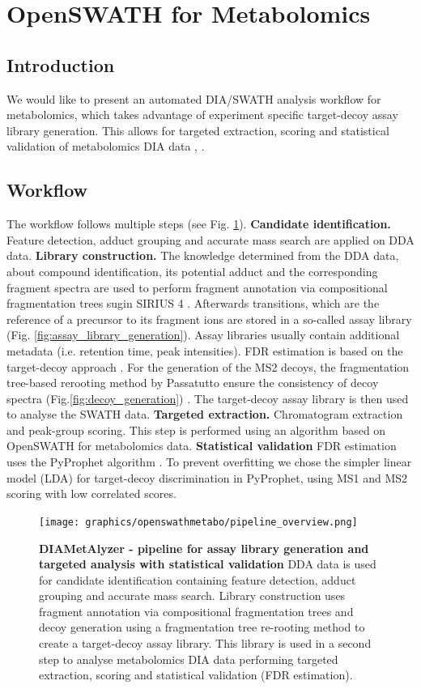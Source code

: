 \section{OpenSWATH for Metabolomics}
\subsection{Introduction}
We would like to present an automated DIA/SWATH analysis workflow for metabolomics, which takes advantage of experiment specific target-decoy assay library generation. This allows for targeted extraction, scoring and statistical validation of metabolomics DIA data \cite{Rost2014}, \cite{Teleman2015}. 

\subsection{Workflow}
The workflow follows multiple steps (see Fig. \ref{fig:pipline_overview}). \textbf{Candidate identification.} Feature detection, adduct grouping and accurate mass search are applied on DDA data. \textbf{Library construction.} The knowledge determined from the DDA data, about  compound identification, its potential adduct and the corresponding fragment spectra are used to perform fragment annotation via compositional fragmentation trees sugin SIRIUS 4 \cite{Duhrkop2019}. Afterwards transitions, which are the reference of a precursor to its fragment ions are stored in a so-called assay library (Fig. \ref{fig:assay_library_generation}). Assay libraries usually contain additional metadata (i.e. retention time, peak intensities). FDR estimation is based on the target-decoy approach \cite{Elias2007}. For the generation of the MS2 decoys, the fragmentation tree-based rerooting method by Passatutto ensure the consistency of decoy spectra (Fig.\ref{fig:decoy_generation}) \cite{Scheubert2017}. The target-decoy assay library is then used to analyse the SWATH data. \textbf{Targeted extraction.} Chromatogram extraction and peak-group scoring. This step is performed using an algorithm based on OpenSWATH \cite{Rost2014} for metabolomics data. \textbf{Statistical validation} FDR estimation uses the PyProphet algorithm \cite{Teleman2015}. To prevent overfitting we chose the simpler linear model (LDA) for target-decoy discrimination in PyProphet, using MS1 and MS2 scoring with low correlated scores.

\begin{figure}[!t]
  \centering
  \texttt{[image: graphics/openswathmetabo/pipeline\_overview.png]}
  \caption{\textbf{DIAMetAlyzer - pipeline for assay library generation and targeted analysis with statistical validation} DDA data is used for candidate identification containing feature detection, adduct grouping and accurate mass search. Library construction uses fragment annotation via compositional fragmentation trees and decoy generation using a fragmentation tree re-rooting method to create a target-decoy assay library. This library is used in a second step to analyse metabolomics DIA data performing targeted extraction, scoring and statistical validation (FDR estimation).}
  \label{fig:pipline_overview}
\end{figure}

